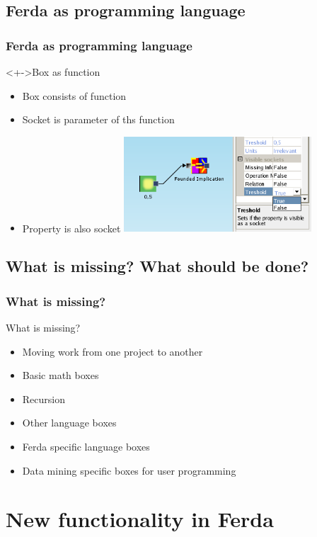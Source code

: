 \documentclass{beamer}
\begin{document}
\subsection{Ferda as programming language}
\begin{frame}
	\frametitle{Ferda as programming language}
	\begin{block}<+->{Box as function}
		\begin{itemize}[<+->]
			\item Box consists of function
			\item Socket is parameter of ths function
			\item Property is also socket
				\includegraphics[width=7cm]{property_as_socket}
		\end{itemize}
	\end{block}	
\end{frame}

\subsection{What is missing? What should be done?}
\begin{frame}
	\frametitle{What is missing?}
	\begin{block}{What is missing?}
		\begin{itemize}[<+->]
			\item Moving work from one project to another
			\item Basic math boxes
			\item Recursion
			\item Other language boxes
			\item Ferda specific language boxes
			\item Data mining specific boxes for user programming
		\end{itemize}
	\end{block}
\end{frame}

\section{New functionality in Ferda}
\end{document}
